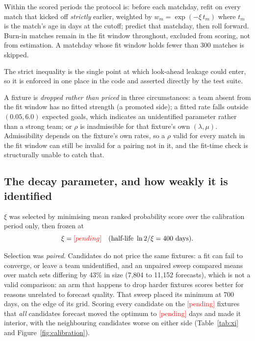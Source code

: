 \documentclass[11pt,a4paper]{article}
\newcommand{\TBD}{\textcolor{red}{[pending]}}
\providecommand{\xifrozen}{\TBD}
\providecommand{\xihalflife}{\TBD}
\providecommand{\xipairedn}{\TBD}
\begin{document}
Within the scored periods the protocol is: before each matchday, refit on every
match that kicked off \emph{strictly} earlier, weighted by
$w_m = \exp(-\xi\, t_m)$ where $t_m$ is the match's age in days at the cutoff;
predict that matchday, then roll forward. Burn-in matches remain in the fit window
throughout, excluded from scoring, not from estimation. A matchday whose fit
window holds fewer than 300 matches is skipped.

The strict inequality is the single point at which look-ahead leakage could
enter, so it is enforced in one place in the code and asserted directly by the
test suite.

A fixture is \emph{dropped rather than priced} in three circumstances: a team
absent from the fit window has no fitted strength (a promoted side); a fitted
rate falls outside $(0.05, 6.0)$ expected goals, which indicates an
unidentified parameter rather than a strong team; or $\rho$ is inadmissible for
that fixture's own $(\lambda, \mu)$. Admissibility depends on the fixture's own
rates, so a $\rho$ valid for every match in the fit window can still be invalid
for a pairing not in it, and the fit-time check is structurally unable to catch
that.

\subsection{The decay parameter, and how weakly it is identified}
\label{sec:xi}

$\xi$ was selected by minimising mean ranked probability score over the
calibration period only, then frozen at
\begin{equation}
  \xi = \xifrozen \quad (\text{half-life } \ln 2/\xi = 400 \text{ days}).
\end{equation}

Selection was \emph{paired}. Candidates do not price the same fixtures: a fit
can fail to converge, or leave a team unidentified, and an unpaired sweep
compared means over match sets differing by 43\% in size (7{,}804 to 11{,}152
forecasts), which is not a valid comparison: an arm that happens to drop harder
fixtures scores better for reasons unrelated to forecast quality. That sweep
placed its minimum at 700 days, on the edge of its grid. Scoring every
candidate on the \xipairedn{} fixtures that \emph{all} candidates forecast
moved the optimum to \xihalflife{} days and made it interior, with the
neighbouring candidates worse on either side (Table~\ref{tab:xi} and
Figure~\ref{fig:calibration}).
\end{document}
